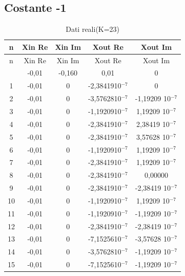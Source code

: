\documentclass[a4paper, titlepage]{article}
\begin{document}
\subsection{Costante -1} \label{tab:const}
\begin{longtable}{*5c}
\caption{Dati reali(K=23)}
\label{}\\
\toprule
n & Xin Re & Xin Im & Xout Re & Xout Im \\
\midrule
\endfirsthead
n & Xin Re & Xin Im & Xout Re & Xout Im \\
\midrule
\endhead
\midrule
\endfoot
\bottomrule
\endlastfoot
0 & -0,01 & -0,160 & 0,01 & 0\\
1 & -0,01 & 0 & -2,3841910$^{-7}$ & 0\\
2 & -0,01 & 0 & -3,5762810$^{-7}$ &-1,19209 10$^{-7}$\\
3 & -0,01 & 0 & -1,1920910$^{-7}$ & 1,19209 10$^{-7}$\\
4 & -0,01& 0 & -2,3841910$^{-7}$ & 2,38419 10$^{-7}$\\
5 & -0,01& 0 & -2,3841910$^{-7}$ & 3,57628 10$^{-7}$\\
6 & -0,01 & 0 & -1,1920910$^{-7}$ & 1,19209 10$^{-7}$\\
7 & -0,01 & 0 & -2,3841910$^{-7}$& 1,19209 10$^{-7}$\\
8 & -0,01& 0 &-2,3841910$^{-7}$ & 0,00000\\
9 & -0,01& 0 & -2,3841910$^{-7}$ & -2,38419 10$^{-7}$\\
10& -0,01& 0 & -1,1920910$^{-7}$ & 1,19209 10$^{-7}$\\
11& -0,01& 0 & -1,1920910$^{-7}$ & -1,19209 10$^{-7}$\\
12& -0,01 & 0 &-2,3841910$^{-7}$ & -2,38419 10$^{-7}$\\
13& -0,01& 0 & -7,1525610$^{-7}$ & -3,57628 10$^{-7}$\\
14& -0,01& 0 &-3,5762810$^{-7}$ & -1,19209 10$^{-7}$\\
15 & -0,01& 0 & -7,1525610$^{-7}$ & -1,19209 10$^{-7}$\\ 
\end{longtable}
\end{document}
